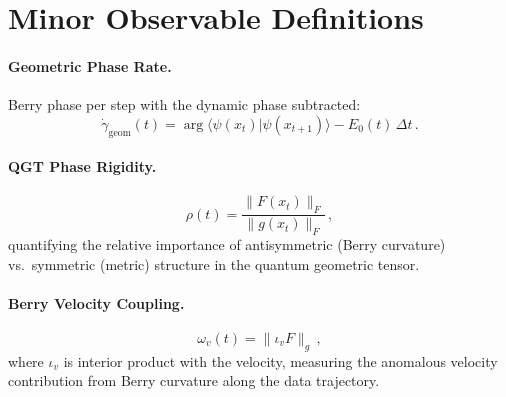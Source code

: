 \documentclass[3p]{elsarticle}
\newcommand{\braket}[2]{\langle#1|#2\rangle}
\begin{document}
\section{Minor Observable Definitions}\label{sec:minor_observables}

\paragraph{Geometric Phase Rate.}
Berry phase per step with the dynamic phase subtracted:
\begin{equation}\label{eq:geom_phase_rate}
  \dot{\gamma}_{\text{geom}}(t) = \arg\braket{\psi(x_t)}{\psi(x_{t+1})}
    - E_0(t)\,\Delta t\,.
\end{equation}

\paragraph{QGT Phase Rigidity.}
\begin{equation}\label{eq:qgt_rigidity}
  \rho(t) = \frac{\|F(x_t)\|_F}{\|g(x_t)\|_F}\,,
\end{equation}
quantifying the relative importance of antisymmetric (Berry curvature)
vs.\ symmetric (metric) structure in the quantum geometric tensor.

\paragraph{Berry Velocity Coupling.}
\begin{equation}\label{eq:berry_vel_coupling}
  \omega_v(t) = \|\iota_v F\|_g\,,
\end{equation}
where $\iota_v$ is interior product with the velocity, measuring the
anomalous velocity contribution from Berry curvature along the
data trajectory.
\end{document}

